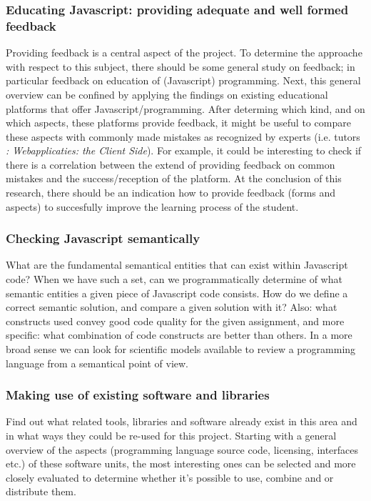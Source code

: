 \documentclass{article}
\begin{document}
\subsubsection{Educating Javascript: providing adequate and well formed feedback }
Providing feedback is a central aspect of the project. To determine the approache
with respect to this subject, there should be some general study on feedback; in particular 
feedback on education of (Javascript) programming. Next, this general overview can be
confined by applying the findings on existing educational platforms that offer Javascript/programming. After determing which kind, and on which aspects, these platforms provide 
feedback, it might be useful to compare these aspects with commonly made mistakes as 
recognized by experts (i.e. tutors {\em: Webapplicaties: the Client Side}). For example, it could be interesting to
check if there is a correlation between the extend of providing feedback on common mistakes
and the success/reception of the platform. At the conclusion of this research, there
should be an indication how to provide feedback (forms and aspects) to 
succesfully improve the learning process of the student.

\subsubsection{Checking Javascript semantically}
What are the fundamental semantical entities that can exist within Javascript
code? When we have such a set, can we programmatically determine of what
semantic entities a given piece of Javascript code consists. How do we define a
correct semantic solution, and compare a given solution with it? Also: what
constructs used convey good code quality for the given assignment, and more
specific: what combination of code constructs are better than others. In a
more broad sense we can look for scientific models available to review a
programming language from a semantical point of view.

\subsubsection{Making use of existing software and libraries}
Find out what related tools, libraries and software already exist in this area
and in what ways they could be re-used for this project. Starting with a
general overview of the aspects (programming language source code, licensing,
interfaces etc.) of these software units, the most interesting ones can be
selected and more closely evaluated to determine whether it's possible to use,
combine and or distribute them.
\end{document}
